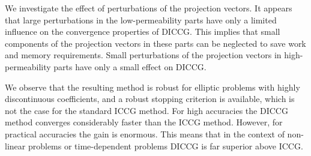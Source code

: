 \documentclass{article}
\begin{document}
We investigate the effect of perturbations of the projection vectors. It
appears that large perturbations in the low-permeability parts
have only a limited influence on
the convergence properties of DICCG. 
This implies that small components of the projection vectors 
in these parts can be neglected to
save work and memory requirements.
Small perturbations of the projection vectors in high-permeability parts
have only a small effect on DICCG.



We observe that
 the resulting method is robust for elliptic problems with highly
discontinuous coefficients, and a robust stopping
criterion is available, which is not the case for the standard 
ICCG method. For high accuracies the DICCG method converges
considerably faster than the  ICCG method. However, for practical
accuracies the gain is enormous. This means that in the context of
non-linear problems or time-dependent problems DICCG is far
superior above ICCG.
\end{document}
